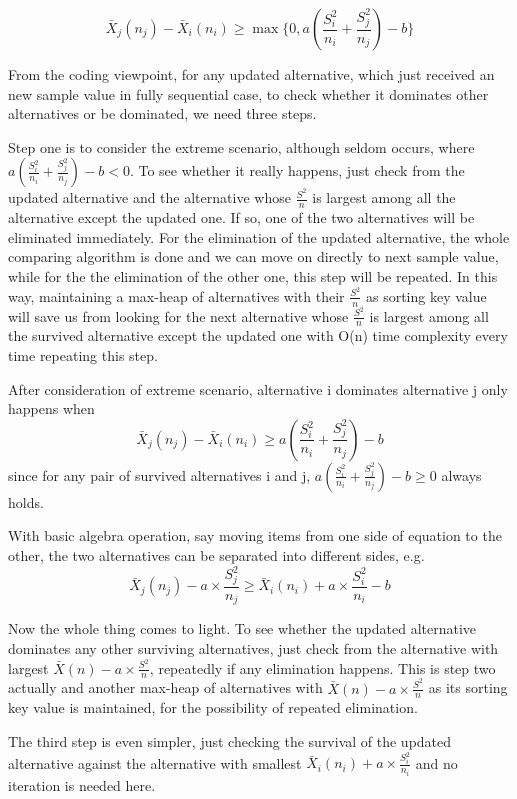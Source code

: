 \documentclass[12pt,a4paper]{report}
\begin{document}
$$ \bar{X}_j(n_j)-\bar{X}_i(n_i) \ge \max\{0,a(\frac{S_i^2}{n_i}+\frac{S_j^2}{n_j}) - b\} $$

From the coding viewpoint, for any updated alternative, which just received an new sample value in fully sequential case, to check whether it dominates other alternatives or be dominated, we need three steps.

Step one is to consider the extreme scenario, although seldom occurs, where $a(\frac{S_i^2}{n_i}+\frac{S_j^2}{n_j}) - b < 0$. To see whether it really happens, just check from the updated alternative and the alternative whose $\frac{S^2}{n}$ is largest among all the alternative except the updated one. If so, one of the two alternatives will be eliminated immediately. For the elimination of the updated alternative, the whole comparing algorithm is done and we can move on directly to next sample value, while for the the elimination of the other one, this step will be repeated. In this way, maintaining a max-heap of alternatives with their $\frac{S^2}{n}$ as sorting key value will save us from looking for the next alternative whose $\frac{S^2}{n}$ is largest among all the survived alternative except the updated one with O(n) time complexity every time repeating this step.

After consideration of extreme scenario, alternative i dominates alternative j only happens when
$$ \bar{X}_j(n_j)-\bar{X}_i(n_i) \ge a(\frac{S_i^2}{n_i}+\frac{S_j^2}{n_j}) - b $$
since for any pair of survived alternatives i and j, $a(\frac{S_i^2}{n_i}+\frac{S_j^2}{n_j}) - b \ge 0$ always holds.

With basic algebra operation, say moving items from one side of equation to the other, the two alternatives can be separated into different sides, e.g.
$$ \bar{X}_j(n_j) - a \times \frac{S_j^2}{n_j} \ge \bar{X}_i(n_i) + a \times \frac{S_i^2}{n_i} - b $$

Now the whole thing comes to light. To see whether the updated alternative dominates any other surviving alternatives, just check from the alternative with largest $\bar{X}(n) - a \times \frac{S^2}{n}$, repeatedly if any elimination happens. This is step two actually and another max-heap of alternatives with $\bar{X}(n) - a \times \frac{S^2}{n}$ as its sorting key value is maintained, for the possibility of repeated elimination.

The third step is even simpler, just checking the survival of the updated alternative against the alternative with smallest $\bar{X}_i(n_i) + a \times \frac{S_i^2}{n_i}$ and no iteration is needed here.
\end{document}
